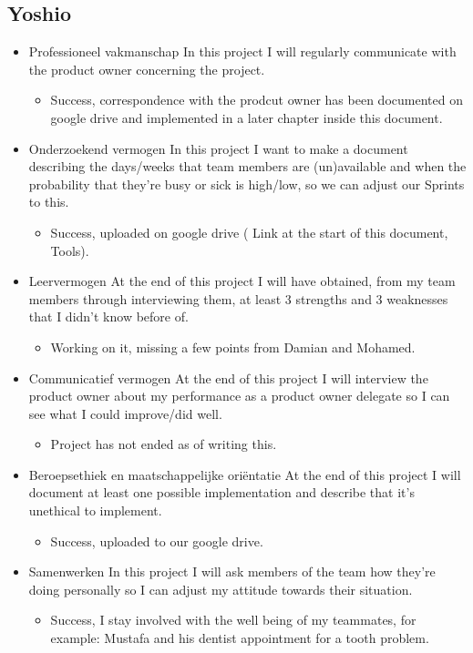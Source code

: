 \documentclass[12pt]{article}
\begin{document}
	\subsection{Yoshio}
	\begin{itemize}
		\item Professioneel vakmanschap
		In this project I will regularly communicate with the product owner concerning the project.
		\begin{itemize}
			\item Success, correspondence with the prodcut owner has been documented on google drive and implemented in a later chapter inside this document. 
		\end{itemize}
		\item Onderzoekend vermogen
		In this project I want to make a document describing the days/weeks that team members are (un)available and when the probability that they’re busy or sick is high/low, so we can adjust our Sprints to this.
		\begin{itemize}
			\item Success, uploaded on google drive ( Link at the start of this document, Tools).
		\end{itemize}
		\item Leervermogen
		At the end of this project I will have obtained, from my team members through interviewing them, at least 3 strengths and 3 weaknesses that I didn’t know before of.
		\begin{itemize}
			\item Working on it, missing a few points from Damian and Mohamed.
		\end{itemize}
		\item Communicatief vermogen
		At the end of this project I will interview the product owner about my performance as a product owner delegate so I can see what I could improve/did well.
		\begin{itemize}
			\item Project has not ended as of writing this.
		\end{itemize}
		\item Beroepsethiek en maatschappelijke oriëntatie
		At the end of this project I will document at least one possible implementation and describe that it’s unethical to implement.
		\begin{itemize}
			\item Success, uploaded to our google drive.
		\end{itemize}
		\item Samenwerken
		In this project I will ask members of the team how they’re doing personally so I can adjust my attitude towards their situation.
		\begin{itemize}
			\item Success, I stay involved with the well being of my teammates, for example: Mustafa and his dentist appointment for a tooth problem.
		\end{itemize}
	\end{itemize}
	\newpage
\end{document}
